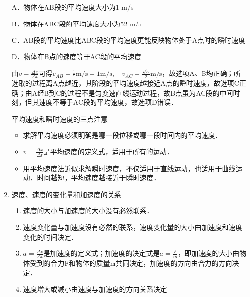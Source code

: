 \documentclass[cn,11pt]{elegantbook}
\begin{document}
\begin{enumerate}
\begin{exercise}
            A．物体在AB段的平均速度大小为1 m/s
            
            B．物体在ABC段的平均速度大小为52 m/s
            
            C．AB段的平均速度比ABC段的平均速度更能反映物体处于A点时的瞬时速度
            
            D．物体在B点的速度等于AC段的平均速度
            \begin{solution}
               由$\overline{v}=\frac{\Delta x}{\Delta t}$可得$\overline{v}_{A B}=\frac{1}{1} \mathrm{m} / \mathrm{s}=1 \mathrm{m} / \mathrm{s}, \quad \overline{v}_{A C}=\frac{\sqrt{5}}{2} \mathrm{m} / \mathrm{s}$，故选项A、B均正确；所选取的过程离A点越近，其阶段的平均速度越接近A点的瞬时速度，故选项C正确；由A经B到C的过程不是匀变速直线运动过程，故B点虽为AC段的中间时刻，但其速度不等于AC段的平均速度，故选项D错误．
               
            \end{solution}
        
            
         \end{exercise}
         \begin{note}
            平均速度和瞬时速度的三点注意
            \begin{itemize}
               \item 求解平均速度必须明确是哪一段位移或哪一段时间内的平均速度．
               \item $\overline{v}=\frac{\Delta x}{\Delta t}$是平均速度的定义式，适用于所有的运动．
               \item 用平均速度法近似求解瞬时速度，不仅适用于直线运动，也适用于曲线运动．时间越短，平均速度越接近于瞬时速度．
            \end{itemize}
         \end{note}
         \item 速度、速度的变化量和加速度的关系
         \begin{enumerate}
            \item 速度的大小与加速度的大小没有必然联系．
            \item 速度变化量与加速度没有必然的联系，速度变化量的大小由加速度和速度变化的时间决定．
            \item $a=\frac{\Delta v}{\Delta t}$是加速度的定义式；加速度的决定式是$a=\frac{F}{m}$，即加速度的大小由物体受到的合力F和物体的质量m共同决定，加速度的方向由合力的方向决定．
            \item 速度增大或减小由速度与加速度的方向关系决定
            

\end{enumerate}
\end{enumerate}
\end{document}
